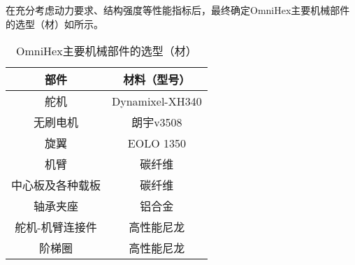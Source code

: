 在充分考虑动力要求、结构强度等性能指标后，最终确定OmniHex主要机械部件的选型（材）如所示。
\begin{table}[htbp]
    \caption{OmniHex主要机械部件的选型（材）\label{tab:mech_parts}}
    \vspace{0.5em}\centering\wuhao
    \begin{tabular}{cc}
    \toprule[1.5pt]
    部件 & 材料（型号）\\
    \midrule[0.2pt]
    舵机 & Dynamixel-XH340 \\
    无刷电机 & 朗宇v3508 \\
    旋翼 & EOLO 1350 \\
    机臂 & 碳纤维 \\
    中心板及各种载板 & 碳纤维 \\
    轴承夹座 & 铝合金 \\
    舵机-机臂连接件 & 高性能尼龙 \\
    阶梯圈 & 高性能尼龙\\
    \bottomrule[1.5pt]
    \end{tabular}
\end{table}


